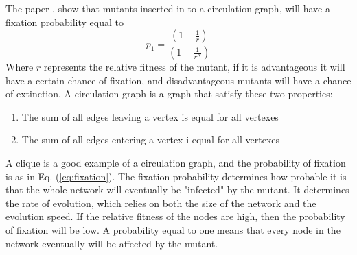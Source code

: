 The paper \cite{lieberman2005evolutionary}, show that mutants inserted in to a
 circulation graph, will have a fixation probability equal to
\begin{equation}  
p_{1}=\frac{(1-\frac{1}{r})}{(1-\frac{1}{r^{N}})}
 \label{eq:fixation} 
\end{equation}
Where $r$ represents the relative fitness of the mutant, if it is advantageous it will have a certain chance of fixation, and disadvantageous mutants will have a chance of extinction. 
A circulation graph is a graph that satisfy these two properties: 
\begin{enumerate}
\item The sum of all edges leaving a vertex is equal for all vertexes
\item The sum of all edges entering a vertex i equal for all vertexes
\end{enumerate}
A clique is a good example of a circulation graph, and the probability of fixation is as in Eq. (\ref{eq:fixation}).
The fixation probability determines how probable it is that the whole network will eventually be
"infected" by the mutant. It determines the rate of evolution, which relies on both the size of the
network and the evolution speed. 
If the relative fitness of the nodes are high, then the probability of fixation will be low.
A probability equal to one means that every node in the network eventually will be affected by the mutant.

